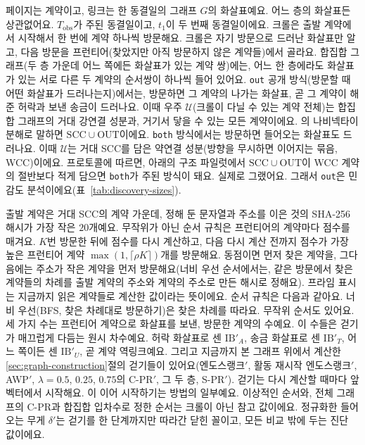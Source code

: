 페이지는 계약이고, 링크는 한 동결일의 그래프 $G$의 화살표예요. 어느 층의 화살표든 상관없어요. $T_{\mathrm{obs}}$가 주된 동결일이고, $t_1$이 두 번째 동결일이에요. 크롤은 출발 계약에서 시작해서 한 번에 계약 하나씩 방문해요. 크롤은 자기 방문으로 드러난 화살표만 알고, 다음 방문을 프런티어(찾았지만 아직 방문하지 않은 계약들)에서 골라요. 합집합 그래프(두 층 가운데 어느 쪽에든 화살표가 있는 계약 쌍)에는, 어느 한 층에라도 화살표가 있는 서로 다른 두 계약의 순서쌍이 하나씩 들어 있어요. \texttt{out} 공개 방식(방문할 때 어떤 화살표가 드러나는지)에서는, 방문하면 그 계약의 나가는 화살표, 곧 그 계약이 해 준 허락과 보낸 송금이 드러나요. 이때 우주 $\mathcal{U}$(크롤이 다닐 수 있는 계약 전체)는 합집합 그래프의 거대 강연결 성분과, 거기서 닿을 수 있는 모든 계약이에요. \textcite{broder2000graph}의 나비넥타이 분해로 말하면 $\mathrm{SCC}\cup\mathrm{OUT}$이에요. \texttt{both} 방식에서는 방문하면 들어오는 화살표도 드러나요. 이때 $\mathcal{U}$는 거대 SCC를 담은 약연결 성분(방향을 무시하면 이어지는 묶음, WCC)이에요. 프로토콜에 따르면, 아래의 구조 파일럿에서 $\mathrm{SCC}\cup\mathrm{OUT}$이 WCC 계약의 절반보다 적게 담으면 \texttt{both}가 주된 방식이 돼요. 실제로 그랬어요. 그래서 \texttt{out}은 민감도 분석이에요(표~\ref{tab:discovery-sizes}).

출발 계약은 거대 SCC의 계약 가운데, 정해 둔 문자열과 주소를 이은 것의 SHA-256 해시가 가장 작은 $20$개예요. 무작위가 아닌 순서 규칙은 프런티어의 계약마다 점수를 매겨요. $K$번 방문한 뒤에 점수를 다시 계산하고, 다음 다시 계산 전까지 점수가 가장 높은 프런티어 계약 $\max(1,\lceil\rho K\rceil)$개를 방문해요. 동점이면 먼저 찾은 계약을, 그다음에는 주소가 작은 계약을 먼저 방문해요(너비 우선 순서에서는, 같은 방문에서 찾은 계약들의 차례를 출발 계약의 주소와 계약의 주소로 만든 해시로 정해요). 프라임 표시는 지금까지 읽은 계약들로 계산한 값이라는 뜻이에요. 순서 규칙은 다음과 같아요. 너비 우선(BFS, 찾은 차례대로 방문하기)은 찾은 차례를 따라요. 무작위 순서도 있어요. 세 가지 수는 프런티어 계약으로 화살표를 보낸, 방문한 계약의 수예요. 이 수들은 걷기가 매끄럽게 다듬는 원시 차수예요. 허락 화살표로 센 $\mathrm{IB}'_A$, 송금 화살표로 센 $\mathrm{IB}'_T$, 어느 쪽이든 센 $\mathrm{IB}'_U$, 곧 계약 역링크예요. 그리고 지금까지 본 그래프 위에서 계산한 \ref{sec:graph-construction}절의 걷기들이 있어요(엔도스랭크$'$, 활동 재시작 엔도스랭크$'$, AWP$'$, $\lambda=0.5$, $0.25$, $0.75$의 \mbox{C-PR}$'$, 그 두 층, \mbox{S-PR}$'$). 걷기는 다시 계산할 때마다 앞 벡터에서 시작해요. 이 이어 시작하기는 방법의 일부예요. 이상적인 순서와, 전체 그래프의 \mbox{C-PR}과 합집합 입차수로 정한 순서는 크롤이 아닌 참고 값이에요. 정규화한 들어오는 무게 $\delta'$는 걷기를 한 단계까지만 따라간 닫힌 꼴이고, 모든 비교 밖에 두는 진단 값이에요.

